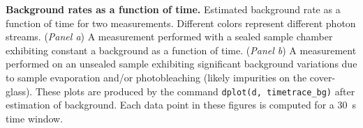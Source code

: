 \label{fig:bg_timetrace} \textbf{Background rates as a function of time.} 
Estimated background rate as a function of time for two \usalex measurements. 
Different colors represent different photon streams. 
(\textit{Panel a}) A measurement performed with a sealed sample chamber 
exhibiting constant a background as a function of time. 
(\textit{Panel b}) A measurement performed on an unsealed sample exhibiting 
significant background variations due to sample evaporation and/or 
photobleaching (likely impurities on the cover-glass). 
These plots are produced by the command
\texttt{dplot(d, timetrace\_bg)} after estimation of background.
Each data point in these figures is computed for a 30~s time window.

